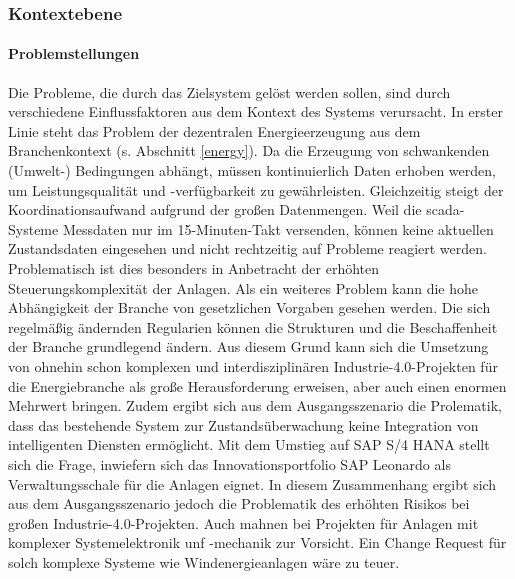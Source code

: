 \subsubsection {Kontextebene}

\paragraph{Problemstellungen}
Die Probleme, die durch das Zielsystem gelöst werden sollen, sind durch verschiedene Einflussfaktoren aus dem Kontext des Systems verursacht. In erster Linie steht das Problem der dezentralen Energieerzeugung aus dem Branchenkontext (s. Abschnitt \ref{energy}). Da die Erzeugung von schwankenden (Umwelt-) Bedingungen abhängt, müssen kontinuierlich Daten erhoben werden, um Leistungsqualität und -verfügbarkeit zu gewährleisten. Gleichzeitig steigt der Koordinationsaufwand aufgrund der großen Datenmengen. Weil die \ac{scada}-Systeme Messdaten nur im 15-Minuten-Takt versenden, können keine aktuellen Zustandsdaten eingesehen und nicht rechtzeitig auf Probleme reagiert werden. Problematisch ist dies besonders in Anbetracht der erhöhten Steuerungskomplexität der Anlagen.
Als ein weiteres Problem kann die hohe Abhängigkeit der Branche von gesetzlichen Vorgaben gesehen werden. Die sich regelmäßig ändernden Regularien können die Strukturen und die Beschaffenheit der Branche grundlegend ändern. Aus diesem Grund kann sich die Umsetzung von ohnehin schon komplexen und interdisziplinären Industrie-4.0-Projekten für die Energiebranche als große Herausforderung erweisen, aber auch einen enormen Mehrwert bringen. Zudem ergibt sich aus dem Ausgangsszenario die Prolematik, dass das bestehende System zur Zustandsüberwachung keine Integration von intelligenten Diensten ermöglicht. Mit dem Umstieg auf SAP S/4 HANA stellt sich die Frage, inwiefern sich das  Innovationsportfolio SAP Leonardo als Verwaltungsschale für die Anlagen eignet. In diesem Zusammenhang ergibt sich aus dem Ausgangsszenario jedoch die Problematik des erhöhten Risikos bei großen Industrie-4.0-Projekten. Auch \citet{Lauenroth2016} mahnen bei Projekten für Anlagen mit komplexer Systemelektronik unf -mechanik zur Vorsicht. Ein Change Request für solch komplexe Systeme wie Windenergieanlagen wäre zu teuer.

